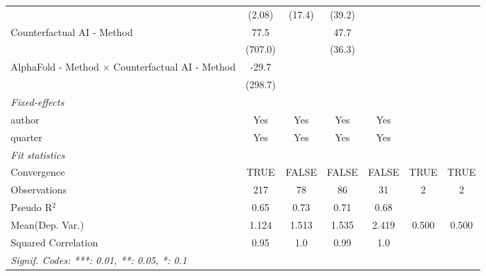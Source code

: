 \begin{tabular}{lcccccc}
                                                           & (2.08)    & (17.4)         & (39.2)        &             &      &   \\   
   Counterfactual AI - Method                              & 77.5      &                & 47.7          &             &      &   \\   
                                                           & (707.0)   &                & (36.3)        &             &      &   \\   
   AlphaFold - Method $\times$ Counterfactual AI - Method  & -29.7     &                &               &             &      &   \\   
                                                           & (298.7)   &                &               &             &      &   \\   
   \midrule
   \emph{Fixed-effects}\\
   author                                                  & Yes       & Yes            & Yes           & Yes         &      & \\  
   quarter                                                 & Yes       & Yes            & Yes           & Yes         &      & \\  
   \midrule
   \emph{Fit statistics}\\
   Convergence                                             &TRUE       & FALSE          & FALSE         & FALSE       & TRUE & TRUE\\  
   Observations                                            & 217       & 78             & 86            & 31          & 2    & 2\\  
   Pseudo R$^2$                                            & 0.65      & 0.73           & 0.71          & 0.68        &      & \\  
Mean(Dep. Var.) & 1.124 & 1.513 & 1.535 & 2.419 & 0.500 & 0.500 \\
   Squared Correlation                                     & 0.95      & 1.0            & 0.99          & 1.0         &      & \\  
   \midrule \midrule
   \multicolumn{7}{l}{\emph{Signif. Codes: ***: 0.01, **: 0.05, *: 0.1}}\\
\end{tabular}
\par\endgroup

